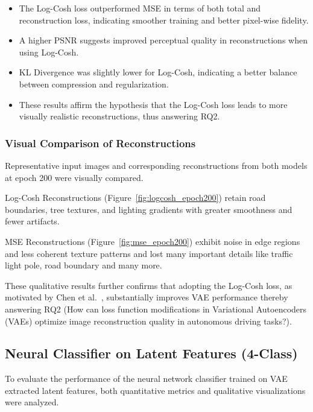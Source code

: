 \begin{itemize}
    \item The Log-Cosh loss outperformed MSE in terms of both total and reconstruction loss, indicating smoother training and better pixel-wise fidelity.
    \item A higher PSNR suggests improved perceptual quality in reconstructions when using Log-Cosh.
    \item KL Divergence was slightly lower for Log-Cosh, indicating a better balance between compression and regularization.
    \item These results affirm the hypothesis that the Log-Cosh loss leads to more visually realistic reconstructions, thus answering RQ2.
\end{itemize}



\subsubsection{Visual Comparison of Reconstructions} \label{subsubsec:vae_visual_recon}
Representative input images and corresponding reconstructions from both models at epoch 200 were visually compared.

Log-Cosh Reconstructions (Figure~\ref{fig:logcosh_epoch200}) retain road boundaries, tree textures, and lighting gradients with greater smoothness and fewer artifacts.

MSE Reconstructions (Figure~\ref{fig:mse_epoch200}) exhibit noise in edge regions and less coherent texture patterns and lost many important details like traffic light pole, road boundary and many more.

These qualitative results further confirms that adopting the Log-Cosh loss, as motivated by Chen et al.~\cite{chen2019log}, substantially improves VAE performance thereby answering RQ2 (How can loss function modifications in Variational Autoencoders (VAEs) optimize image reconstruction quality in autonomous driving tasks?).







\subsection{Neural Classifier on Latent Features (4-Class)}

To evaluate the performance of the neural network classifier trained on VAE extracted latent features, both quantitative metrics and qualitative visualizations were analyzed.

